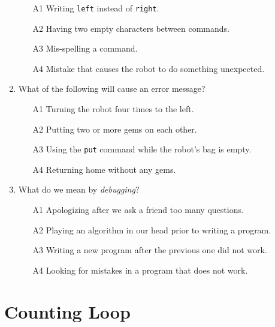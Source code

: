 \begin{enumerate}
\begin{enumerate}
\item[A1] Writing {\tt left} instead of {\tt right}.
\item[A2] Having two empty characters between commands.
\item[A3] Mis-spelling a command.  
\item[A4] Mistake that causes the robot to do something unexpected.
\end{enumerate}
\item What of the following will cause an error message?
\begin{enumerate}
\item[A1] Turning the robot four times to the left.
\item[A2] Putting two or more gems on each other.
\item[A3] Using the {\tt put} command while the robot's bag is empty.
\item[A4] Returning home without any gems.
\end{enumerate}
\item What do we mean by {\em debugging}?
\begin{enumerate}
\item[A1] Apologizing after we ask a friend too many questions.
\item[A2] Playing an algorithm in our head prior to writing a program. 
\item[A3] Writing a new program after the previous one did not work.
\item[A4] Looking for mistakes in a program that does not work.
\end{enumerate}
\end{enumerate}


\section{Counting Loop}

